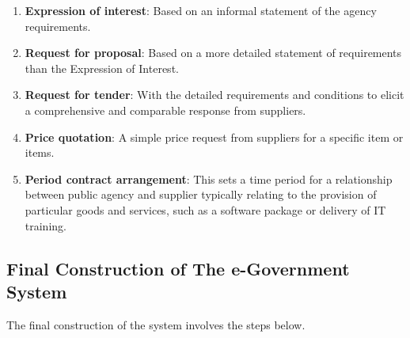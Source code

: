 \begin{enumerate}
	\item \textbf{Expression of interest}: Based on an informal statement of the agency requirements. 
	\item  \textbf{Request for proposal}: Based on a more detailed statement of requirements than the Expression of Interest.
	\item \textbf{Request for tender}: With the detailed requirements and conditions to elicit a
	comprehensive and comparable response from suppliers.
	\item \textbf{Price quotation}: A simple price request from suppliers for a specific item or items.
	\item \textbf{Period contract arrangement}: This sets a
	time period for a relationship between
	public agency and supplier typically
	relating to the provision of particular
	goods and services, such as a software
	package or delivery of IT training.
\end{enumerate}

\subsection{Final Construction of The e-Government System}
The final construction of the system
involves the steps below.

